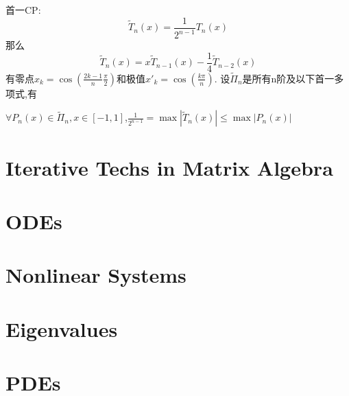 \documentclass{article}
\begin{document}
首一CP:
$$
\widetilde T_n(x)=\frac{1}{2^{n-1}}T_n(x)
$$
那么
$$
\widetilde T_n(x)=x\widetilde T_{n-1}(x)-\frac{1}{4}\widetilde T_{n-2}(x)
$$
有零点$x_k=\cos(\frac{2k-1}{n}\frac{\pi}{2})$和极值$x'_k=\cos(\frac{k\pi}{n})$.
设$\widetilde \Pi_n$是所有n阶及以下首一多项式,有

\trm $\forall P_n (x)\in\widetilde\Pi_n,x\in[−1,1]$,$\frac{1}{2^{n−1}}=\max⁡|\widetilde{T}_n(x)|\le\max⁡|P_n(x)|$

\coro

\section{Iterative Techs in Matrix Algebra}

\section{ODEs}

\section{Nonlinear Systems}

\section{Eigenvalues}

\section{PDEs}
\end{document}
